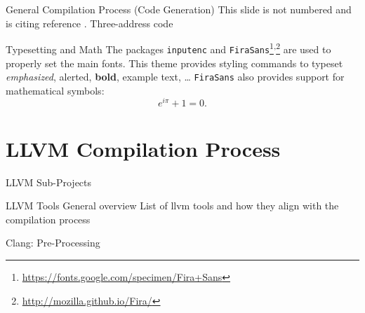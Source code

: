 \documentclass{beamer}
\begin{document}

\begin{frame}{General Compilation Process (Code Generation)}
    This slide is not numbered and is citing reference \cite{knuth74}.
    Three-address code
\end{frame}


\begin{frame}{Typesetting and Math}
    The packages \texttt{inputenc} and \texttt{FiraSans}\footnote{\url{https://fonts.google.com/specimen/Fira+Sans}}\textsuperscript{,}\footnote{\url{http://mozilla.github.io/Fira/}} are used to properly set the main fonts.
    \vfill
    This theme provides styling commands to typeset \emph{emphasized}, \alert{alerted}, \textbf{bold}, \textcolor{example}{example text}, \dots
    \vfill
    \texttt{FiraSans} also provides support for mathematical symbols:
    \begin{equation*}
        e^{i\pi} + 1 = 0.
    \end{equation*}
\end{frame}


\section{LLVM Compilation Process}


\begin{frame}{LLVM Sub-Projects}
\end{frame}


\begin{frame}{LLVM Tools}
General overview
List of llvm tools and how they align with the compilation process
\end{frame}


\begin{frame}{Clang: Pre-Processing}
\end{frame}

\end{document}
